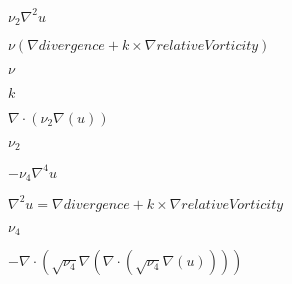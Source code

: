 \documentclass{article}
\begin{document}
$\nu_2 \nabla^2 u$
\pagebreak

$\nu( \nabla divergence + k \times \nabla relativeVorticity )$
\pagebreak

$\nu$
\pagebreak

$k$
\pagebreak

$\nabla\cdot( \nu_2 \nabla(u))$
\pagebreak

$\nu_2$
\pagebreak

$-\nu_4 \nabla^4 u$
\pagebreak

$\nabla^2 u = \nabla divergence + k \times \nabla relativeVorticity$
\pagebreak

$\nu_4$
\pagebreak

$-\nabla\cdot( \sqrt{\nu_4} \nabla(\nabla\cdot( \sqrt{\nu_4} \nabla(u))))$
\pagebreak
\end{document}
